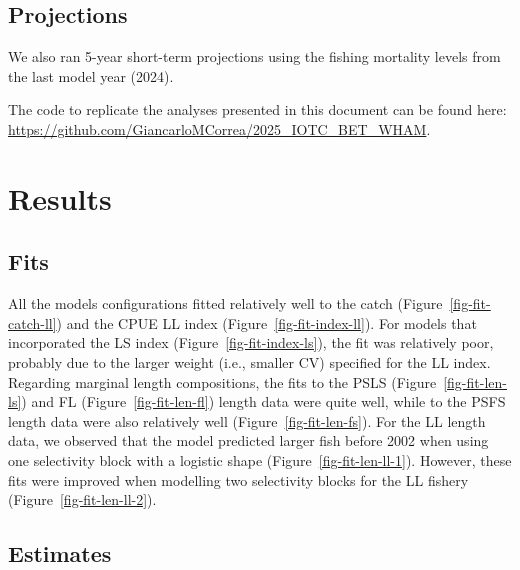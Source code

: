 \documentclass[
]{scrartcl}
\begin{document}
\subsection{Projections}\label{projections}

We also ran 5-year short-term projections using the fishing mortality
levels from the last model year (2024).

The code to replicate the analyses presented in this document can be
found here:
\url{https://github.com/GiancarloMCorrea/2025_IOTC_BET_WHAM}.

\section{Results}\label{results}

\subsection{Fits}\label{fits}

All the models configurations fitted relatively well to the catch
(Figure~\ref{fig-fit-catch-ll}) and the CPUE LL index
(Figure~\ref{fig-fit-index-ll}). For models that incorporated the LS
index (Figure~\ref{fig-fit-index-ls}), the fit was relatively poor,
probably due to the larger weight (i.e., smaller CV) specified for the
LL index. Regarding marginal length compositions, the fits to the PSLS
(Figure~\ref{fig-fit-len-ls}) and FL (Figure~\ref{fig-fit-len-fl})
length data were quite well, while to the PSFS length data were also
relatively well (Figure~\ref{fig-fit-len-fs}). For the LL length data,
we observed that the model predicted larger fish before 2002 when using
one selectivity block with a logistic shape
(Figure~\ref{fig-fit-len-ll-1}). However, these fits were improved when
modelling two selectivity blocks for the LL fishery
(Figure~\ref{fig-fit-len-ll-2}).

\subsection{Estimates}\label{estimates}
\end{document}
